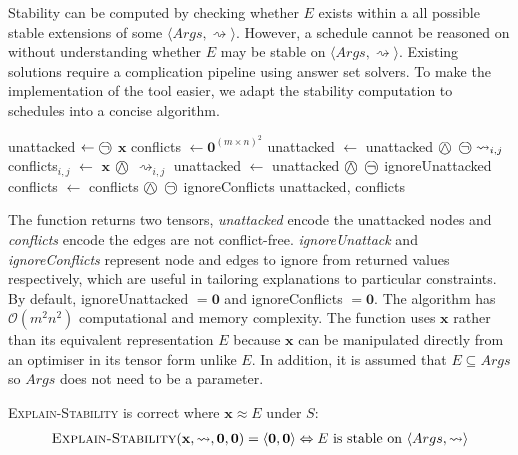 Stability can be computed by checking whether $E$ exists within a all possible stable extensions of some $\langle Args, \rightsquigarrow\rangle$. However, a schedule cannot be reasoned on without understanding whether $E$ may be stable on $\langle Args, \rightsquigarrow\rangle$. Existing solutions require a complication pipeline using answer set solvers. To make the implementation of the tool easier, we adapt the stability computation to schedules into a concise algorithm.

\begin{algorithm}
	\begin{algorithmic}[1]
			\State unattacked $\gets\incircbin{\neg}$ $\mathbf{x}$
			\State conflicts $\gets\mathbf{0}^{(m\times n)^2}$
						\State unattacked $\gets$ unattacked $\incircbin{\land}$ $\incircbin{\neg}\rightsquigarrow_{i,j}$
						\State conflicts$_{i,j}$ $\gets$ $\mathbf{x}$ $\incircbin{\land}$ $\rightsquigarrow_{i,j}$ 
					\EndIf
				\EndFor
			\EndFor
			\State unattacked $\gets$ unattacked $\incircbin{\land}$ $\incircbin{\neg}$ ignoreUnattacked
			\State conflicts $\gets$ conflicts $\incircbin{\land}$ $\incircbin{\neg}$ ignoreConflicts
			\State \Return unattacked, conflicts
		\EndFunction
	\end{algorithmic}
\end{algorithm}

The function returns two tensors, \emph{unattacked} encode the unattacked nodes and \emph{conflicts} encode the edges are not conflict-free. \emph{ignoreUnattack} and \emph{ignoreConflicts} represent node and edges to ignore from returned values respectively, which are useful in tailoring explanations to particular constraints. By default, ignoreUnattacked $=\mathbf{0}$ and ignoreConflicts $=\mathbf{0}$. The algorithm has $\mathcal{O}(m^2n^2)$ computational and memory complexity. The function uses $\mathbf{x}$ rather than its equivalent representation $E$ because $\mathbf{x}$ can be manipulated directly from an optimiser in its tensor form unlike $E$. In addition, it is assumed that $E\subseteq Args$ so $Args$ does not need to be a parameter.

\begin{theorem}
	\textsc{Explain-Stability} is correct where $\mathbf{x}\approx E$ under $S$:
	\begin{align*}
		\textsc{Explain-Stability}(\mathbf{x},\rightsquigarrow,\mathbf{0},\mathbf{0})=\langle \mathbf{0},\mathbf{0}\rangle\Leftrightarrow E\text{ is stable on }\langle Args, \rightsquigarrow\rangle
	\end{align*}
\end{theorem}
	
